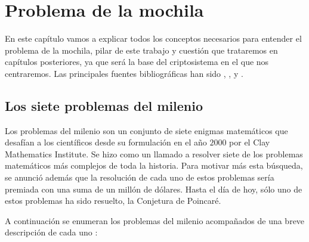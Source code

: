 \chapter{Problema de la mochila} \label{ch:segundo-capitulo}

    En este capítulo vamos a explicar todos los conceptos necesarios para entender el problema de la mochila, pilar de este trabajo y cuestión que trataremos en capítulos posteriores, ya que será la base del criptosistema en el que nos centraremos. Las principales fuentes bibliográficas han sido \cite{probMil}, \cite{defPM}, \cite{theoryComp} y \cite{MTformal}.

    \section{Los siete problemas del milenio}

    Los problemas del milenio son un conjunto de siete enigmas matemáticos que desafían a los científicos desde su formulación en el año $2000$ por el Clay Mathematics Institute. Se hizo como un llamado a resolver siete de los problemas matemáticos más complejos de toda la historia. Para motivar más esta búsqueda, se anunció además que la resolución de cada uno de estos problemas sería premiada con una suma de un millón de dólares. Hasta el día de hoy, sólo uno de estos problemas ha sido resuelto, la Conjetura de Poincaré. 

    A continuación se enumeran los problemas del milenio acompañados de una breve descripción de cada uno \cite{probMil}:

